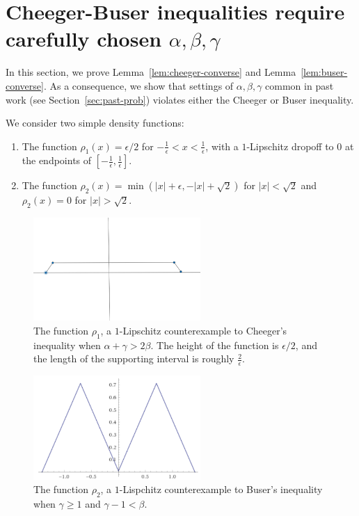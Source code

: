 
\section{Cheeger-Buser inequalities require carefully chosen $\alpha, \beta,
\gamma$}
\label{sec:examples}


In this section, we prove Lemma~\ref{lem:cheeger-converse} and
Lemma~\ref{lem:buser-converse}. As a consequence, we show that
settings of $\alpha, \beta, \gamma$ common in past work (see
Section~\ref{sec:past-prob}) violates either the Cheeger or Buser
inequality.

We consider two simple density functions:
\begin{enumerate} 
  \item The function $\rho_1(x) = \epsilon/2$ for $-\frac{1}{\epsilon}
    < x < \frac{1}{\epsilon}$, with a $1$-Lipschitz dropoff to $0$
    at the endpoints of $[-\frac{1}{\epsilon},
    \frac{1}{\epsilon}]$.
  \item The function $\rho_2(x) = \min(|x|+\epsilon,
    -|x|+\sqrt{2})$ for $|x| < \sqrt{2}$ and $\rho_2(x) = 0$
    for $|x| > \sqrt{2}$.
\end{enumerate}

\begin{figure}[H]
\centering
\includegraphics[width=2.5in]{spectralcluster/images/cheeger-counterexample.png}
\caption{
  The function $\rho_1$, a $1$-Lipschitz counterexample to Cheeger's inequality
  when $\alpha + \gamma > 2\beta$. 
  The height of the
  function is $\epsilon/2$, and the length of the supporting
  interval is roughly $\frac{2}{\epsilon}$.
 }
\label{fig:buser-counterexample}
\end{figure}

\begin{figure}[H]
\centering
\includegraphics[width=2.5in]{spectralcluster/images/buser-counterexample.png}
\caption{
  The function $\rho_2$, a $1$-Lispchitz counterexample to Buser's inequality
  when $\gamma \geq 1$ and $ \gamma - 1 < \beta$.
 }
\label{fig:buser-counterexample}
\end{figure}


